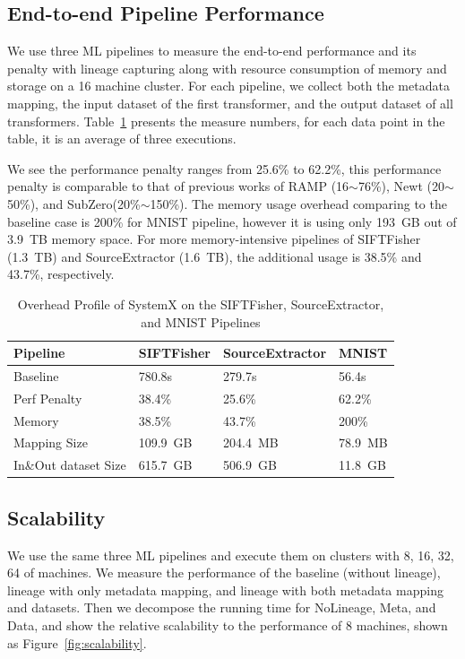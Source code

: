 \documentclass{sig-alternate}
\begin{document}
\subsection{End-to-end Pipeline Performance}
We use three ML pipelines to measure the end-to-end performance and its penalty with lineage capturing
along with resource consumption of memory and storage on a 16 machine cluster.
For each pipeline, we collect both the metadata mapping, the input dataset of the first transformer,  and the output dataset of all transformers.
Table~\ref{tb:apps-overhead} presents the measure numbers, for each data point in the table, it is an
average of three executions. 

We see the performance penalty ranges from 25.6\% to 62.2\%, this performance penalty is comparable to that
of previous works of RAMP (16$\sim$76\%), Newt (20$\sim$50\%), and SubZero(20\%$\sim$150\%).
The memory usage overhead comparing to the baseline case is 200\% for MNIST pipeline, however it is using only
193~GB out of 3.9~TB memory space. 
For more memory-intensive pipelines of SIFTFisher (1.3~TB) and SourceExtractor (1.6~TB), the additional usage is 38.5\% and 43.7\%, respectively.

\begin{table}[t]
\begin{center}
    \caption{Overhead Profile of SystemX on the SIFTFisher, SourceExtractor, and MNIST Pipelines}
    \begin{scriptsize}
    \begin{tabular}{ | p{1.8cm} | p{1.8cm} | p{1.8cm} | p{1.5cm} | }
    \hline
    Pipeline & SIFTFisher & SourceExtractor & MNIST  \\ \hline \hline
    Baseline & 780.8s & 279.7s & 56.4s \\ \hline
    Perf Penalty & 38.4\% & 25.6\% & 62.2\%   \\ \hline
    Memory & 38.5\% & 43.7\% & 200\%\\ \hline
    Mapping Size & 109.9~GB & 204.4~MB & 78.9~MB \\ \hline
    In\&Out dataset Size & 615.7~GB & 506.9~GB & 11.8~GB\\ \hline
    \end{tabular}
    \end{scriptsize}
    \label{tb:apps-overhead}
\end{center}   
\end{table}

\subsection{Scalability}
We use the same three ML pipelines and execute them on clusters with {8, 16, 32, 64} of machines.
We measure the performance of the baseline (without lineage), lineage with only metadata mapping, 
and lineage with both metadata mapping and datasets. 
Then we decompose the running time for NoLineage, Meta, and Data, and show the relative scalability
 to the performance of 8 machines, shown as Figure~\ref{fig:scalability}.
\end{document}
